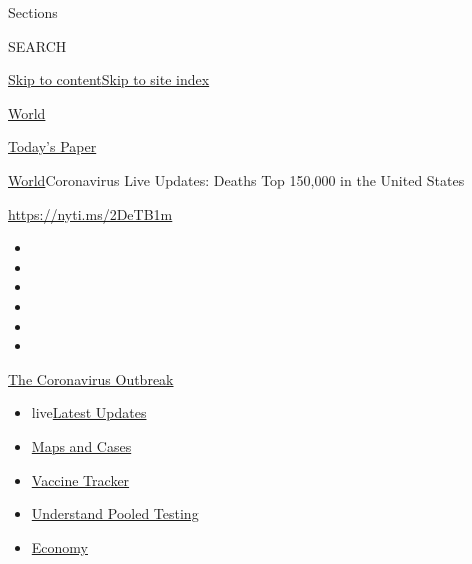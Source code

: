 Sections

SEARCH

\protect\hyperlink{site-content}{Skip to
content}\protect\hyperlink{site-index}{Skip to site index}

\href{https://www.nytimes.com/section/world}{World}

\href{https://myaccount.nytimes.com/auth/login?response_type=cookie\&client_id=vi}{}

\href{https://www.nytimes.com/section/todayspaper}{Today's Paper}

\href{/section/world}{World}\textbar{}Coronavirus Live Updates: Deaths
Top 150,000 in the United States

\url{https://nyti.ms/2DeTB1m}

\begin{itemize}
\item
\item
\item
\item
\item
\item
\end{itemize}

\href{https://www.nytimes.com/news-event/coronavirus?action=click\&pgtype=Article\&state=default\&region=TOP_BANNER\&context=storylines_menu}{The
Coronavirus Outbreak}

\begin{itemize}
\tightlist
\item
  live\href{https://www.nytimes.com/2020/07/29/world/coronavirus-covid-19.html?action=click\&pgtype=Article\&state=default\&region=TOP_BANNER\&context=storylines_menu}{Latest
  Updates}
\item
  \href{https://www.nytimes.com/interactive/2020/us/coronavirus-us-cases.html?action=click\&pgtype=Article\&state=default\&region=TOP_BANNER\&context=storylines_menu}{Maps
  and Cases}
\item
  \href{https://www.nytimes.com/interactive/2020/science/coronavirus-vaccine-tracker.html?action=click\&pgtype=Article\&state=default\&region=TOP_BANNER\&context=storylines_menu}{Vaccine
  Tracker}
\item
  \href{https://www.nytimes.com/interactive/2020/07/27/upshot/coronavirus-pooled-testing.html?action=click\&pgtype=Article\&state=default\&region=TOP_BANNER\&context=storylines_menu}{Understand
  Pooled Testing}
\item
  \href{https://www.nytimes.com/live/2020/07/29/business/stock-market-today-coronavirus?action=click\&pgtype=Article\&state=default\&region=TOP_BANNER\&context=storylines_menu}{Economy}
\end{itemize}

